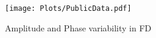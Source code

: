 
\begin{figure}[H]
\begin{center}
\texttt{[image: Plots/PublicData.pdf]}
\end{center}
\caption{Amplitude and Phase variability in FD}
\label{fig:Fig3_pinch}
\end{figure}

